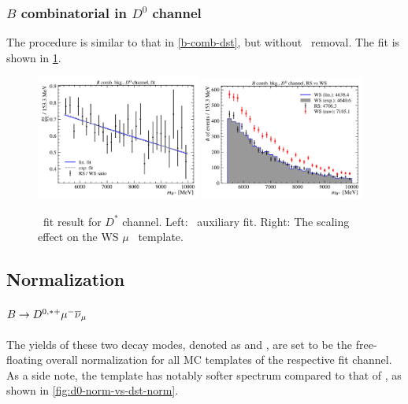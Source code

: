 \subsubsection{$B$ combinatorial in $D^0$ channel}
\label{b-comb-d0}

The procedure is similar to that in \cref{b-comb-dst}, but without \DstComb\
removal. The fit is shown in \cref{fig:b-comb-d0}.

\begin{figure}[!htb]
    \centering
    \includegraphics[width=0.48\textwidth]{figs-fit-fit-templates/data-driven-plots/b_comb/fit_b_comb_d0_fit.pdf}
    \includegraphics[width=0.48\textwidth]{figs-fit-fit-templates/data-driven-plots/b_comb/fit_b_comb_d0_scaled.pdf}

    \caption{
        \BComb\ fit result for $D^*$ channel.
        Left: \BComb\ auxiliary fit.
        Right: The scaling effect on the WS $\mu$ \BComb\ template.
    }
    \label{fig:b-comb-d0}
\end{figure}


\subsection{Normalization}
\label{tmpl:norm}

\paragraph{$B \rightarrow D^{0,*+}{\mu^-}{{\overline{\nu}}_\mu}$}
The yields of these two decay modes,
denoted as \fitNDmu and \fitNmu,
are set to be the free-floating overall normalization for all MC templates of
the respective fit channel.
As a side note,
the \Dz\muon template has notably softer \qSq spectrum compared to
that of \Dstarp\muon,
as shown in \cref{fig:d0-norm-vs-dst-norm}.

